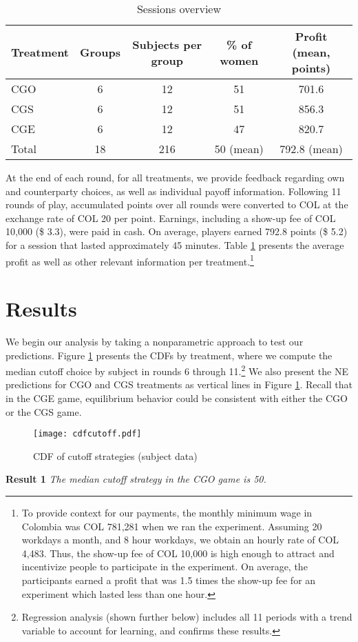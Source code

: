 \documentclass[12pt, letterpaper]{article}
\theoremstyle{plain}
\begin{document}
\begin{table}[ht]
\centering
\caption{Sessions overview }
\hline
\begin{tabular}{lcccc}
  Treatment & Groups & Subjects per group & \% of women & Profit (mean, points)\\
  \hline  
  CGO & 6 & 12 & 51 & 701.6 \\
  CGS & 6 & 12 & 51 & 856.3 \\
  CGE & 6 & 12 & 47 & 820.7 \\
\hline
Total & 18 & 216 &  50 (mean) & 792.8 (mean)\\
\end{tabular}

\label{session}
\end{table}

At the end of each round, for all treatments, we provide feedback regarding own and counterparty choices, as well as individual payoff information. Following 11 rounds of play, accumulated points over all rounds were converted to COL at the exchange rate of COL 20 per point. Earnings, including a show-up fee of COL 10,000 (\$ 3.3), were paid in cash. On average, players earned 792.8 points (\$ 5.2) for a session that lasted approximately 45 minutes. Table \ref{session} presents the average profit as well as other relevant information per treatment.\footnote{To provide context for our payments, the monthly minimum wage in Colombia was COL 781,281 when we ran the experiment. Assuming 20 workdays a month, and 8 hour workdays, we obtain an hourly rate of COL 4,483. Thus, the show-up fee of COL 10,000 is high enough to attract and incentivize people to participate in the experiment. On average, the participants earned a profit that was 1.5 times the show-up fee for an experiment which lasted less than one hour.} 

\section{Results}
\label{sec:results}

We begin our analysis by taking a nonparametric approach to test our predictions. Figure \ref{fig:allcutoff} presents the CDFs by treatment, where we compute the median cutoff choice by subject in rounds 6 through 11.\footnote{Regression analysis (shown further below) includes all 11 periods with a trend variable to account for learning, and confirms these results.} We also present the NE predictions for CGO and CGS treatments as vertical lines in Figure \ref{fig:allcutoff}. Recall that in the CGE game, equilibrium behavior could be consistent with either the CGO or the CGS game. 
\begin{center}
\begin{figure}[!ht]
\centering{}%
\texttt{[image: cdfcutoff.pdf]}%
\caption{CDF of cutoff strategies (subject data) \\ } 
\label{fig:allcutoff}
\end{figure}
\end{center}
\noindent \textbf{Result 1}
\textit{The median cutoff strategy in the CGO game is 50.}
\\
\end{document}
